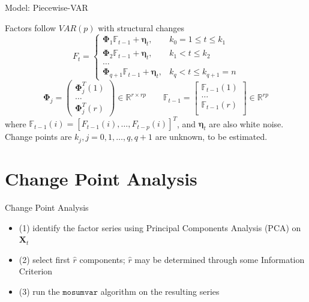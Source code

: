 \documentclass[11pt]{beamer}
\begin{document}
\begin{frame}{Model: Piecewise-VAR} 

 Factors follow $VAR(p)$ with structural changes  
    $$
     {F}_{t}=\left\{\begin{array}{ll}
    {\boldsymbol{\Phi}_{1}\mathbb{F}_{t-1} + \boldsymbol{\eta}_{t},} & {k_0 = 1 \leq t \leq {k}_1} \\
    {\boldsymbol{\Phi}_{2}\mathbb{F}_{t-1} + \boldsymbol{\eta}_{t},} & {{k}_1 <t \leq {k}_2}  \\
    {\dots}                                                                                             \\ 
    {\boldsymbol{\Phi}_{q+1}\mathbb{F}_{t-1} + \boldsymbol{\eta}_{t},} & {{k}_{q} <t \leq {k}_{q+1}=n } 
    \end{array}\right. 
    $$
     $$  \boldsymbol{\Phi}_j = \left( \begin{array}{ll}  \boldsymbol{\Phi}_j^T(1)\\
        \dots \\
        \boldsymbol{\Phi}_j^T(r)
        \end{array}\right) \in \mathbb{R}^{r \times rp} 
        \quad \quad \mathbb{F}_{t-1} =\left[  \begin{array}{ll}
        \mathbb{F}_{t-1}(1) \\ 
        \ldots \\
        \mathbb{F}_{t-1}(r) \\
        \end{array}\right] \in \mathbb{R}^{ rp} %
    $$
where $\mathbb{F}_{t-1}(i) =\left[ F_{t-1}(i), \ldots, F_{t-p}(i)\right]^{T}$, and $\boldsymbol{\eta}_t$ are also white noise.
Change points are ${k}_j, j = 0, 1, \dots, q, q+1$ are unknown, to be estimated.
 
\end{frame}

\section{Change Point Analysis} 
\begin{frame}{Change Point Analysis} 
\begin{itemize}
	\item (1) identify the factor series using Principal Components Analysis (PCA) on $\boldsymbol{X}_t$
	\item (2) select first $\hat{r}$ components; $\hat{r}$ may be determined through some Information Criterion
	\item (3) run the $\texttt{mosumvar}$ algorithm on the resulting series
\end{itemize}
\end{frame}
\end{document}
